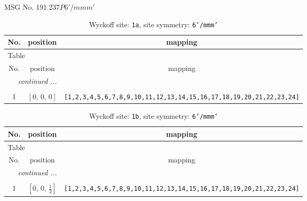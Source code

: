 \documentclass[fleqn,8pt]{jsarticle}
\begin{document}
\setcounter{MaxMatrixCols}{32}

\renewcommand{\tablename}{Table~}
\renewcommand{\figurename}{Figure~}
\begin{center}
\LARGE
MSG No. 191.237\quad$P6'/mmm'$
\end{center}
\renewcommand{\arraystretch}{1.2}
\begin{longtable}{ccc}
\caption{Wyckoff site: {\tt 1a}, site symmetry: {\tt 6'/mmm'}}
 \\
 \hline \hline
No. & position & mapping \\ \hline \endfirsthead

\multicolumn{2}{l}{\tablename\ \thetable{}} \\
 \hline \hline
No. & position & mapping \\ \hline \endhead

 \hline \hline
\multicolumn{2}{r}{\footnotesize\it continued ...} \\ \endfoot

 \hline \hline
\multicolumn{2}{r}{} \\ \endlastfoot

1 & $\left[ 0,\, 0,\, 0 \right]$ & {\tt [1,2,3,4,5,6,7,8,9,10,11,12,13,14,15,16,17,18,19,20,21,22,23,24]} \\
\end{longtable}
\renewcommand{\arraystretch}{1.2}
\begin{longtable}{ccc}
\caption{Wyckoff site: {\tt 1b}, site symmetry: {\tt 6'/mmm'}}
 \\
 \hline \hline
No. & position & mapping \\ \hline \endfirsthead

\multicolumn{2}{l}{\tablename\ \thetable{}} \\
 \hline \hline
No. & position & mapping \\ \hline \endhead

 \hline \hline
\multicolumn{2}{r}{\footnotesize\it continued ...} \\ \endfoot

 \hline \hline
\multicolumn{2}{r}{} \\ \endlastfoot

1 & $\left[ 0,\, 0,\, \frac{1}{2} \right]$ & {\tt [1,2,3,4,5,6,7,8,9,10,11,12,13,14,15,16,17,18,19,20,21,22,23,24]} \\
\end{longtable}
\renewcommand{\arraystretch}{1.2}
\end{document}
